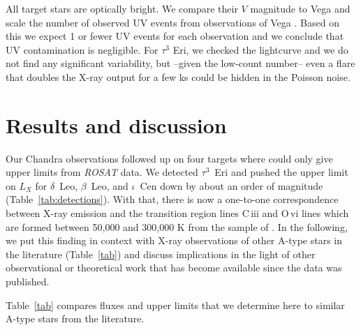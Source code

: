 \documentclass[preprint2]{aastex631}
\begin{document}
All target stars are optically bright. We compare their $V$ magnitude
to Vega and scale the number of observed UV events from observations
of Vega \citep{2006ApJ...636..426P}. Based on this we expect 1 or fewer UV
events for each observation and we conclude that UV contamination is
negligible. For $\tau^3$ Eri, we checked the lightcurve and we do not find any significant variability, but --given the low-count number-- even a flare that doubles the X-ray output for a few ks could be hidden in the Poisson noise.


\section{Results and discussion}  \label{sec:discussion}
Our Chandra observations followed up on four targets where \cite{2002ApJ...579..800S} could only give upper limits from \emph{ROSAT} data. We detected $\tau^3$~Eri and pushed the upper limit on $L_X$ for $\delta$~Leo, $\beta$~Leo, and $\iota$~Cen down by about an order of magnitude (Table~\ref{tab:detections}). With that, there is now a one-to-one correspondence between X-ray emission and the transition region lines C\,{\sc iii} and O\,{\sc vi} lines which are formed between 50,000 and 300,000 K from the sample of \cite{2002ApJ...579..800S}. In the following, we put this finding in context with X-ray observations of other A-type stars in the literature (Table~\ref{tab}) and discuss implications in the light of other observational or theoretical work that has become available since the \cite{2002ApJ...579..800S} data was published.

Table~\ref{tab} compares fluxes and upper limits that we determine here to similar A-type stars from the literature.
\end{document}
